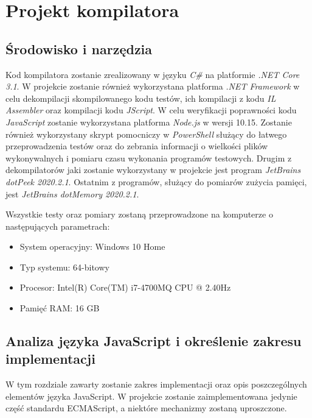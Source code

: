 \chapter{Projekt kompilatora}
\label{rozdzial2}
\section{Środowisko i narzędzia}
\par Kod kompilatora zostanie zrealizowany w języku \textit{C\#} na platformie \textit{.NET Core 3.1}. W projekcie zostanie również wykorzystana platforma \textit{.NET Framework} w celu dekompilacji skompilowanego kodu testów, ich kompilacji z kodu \textit{IL Assembler} oraz kompilacji kodu \textit{JScript}. W celu weryfikacji poprawności kodu \textit{JavaScript} zostanie wykorzystana platforma \textit{Node.js} w wersji 10.15. Zostanie również wykorzystany skrypt pomocniczy w \textit{PowerShell} służący do łatwego przeprowadzenia testów oraz do zebrania informacji o wielkości plików wykonywalnych i pomiaru czasu wykonania programów testowych. Drugim z dekompilatorów jaki zostanie wykorzystany w projekcie jest program \textit{JetBrains dotPeek 2020.2.1}. Ostatnim z programów, służący do pomiarów zużycia pamięci, jest \textit{JetBrains dotMemory 2020.2.1}.
\par Wszystkie testy oraz pomiary zostaną przeprowadzone na komputerze o następujących parametrach:
\begin{itemize}
  \item System operacyjny: Windows 10 Home
  \item Typ systemu: 64-bitowy
  \item Procesor: Intel(R) Core(TM) i7-4700MQ CPU @ 2.40Hz
  \item Pamięć RAM: 16 GB
\end{itemize}

\section{Analiza języka JavaScript i określenie zakresu implementacji}

\par W tym rozdziale zawarty zostanie zakres implementacji oraz opis poszczególnych elementów języka JavaScript. W projekcie zostanie zaimplementowana jedynie część standardu ECMAScript, a niektóre mechanizmy zostaną uproszczone.

